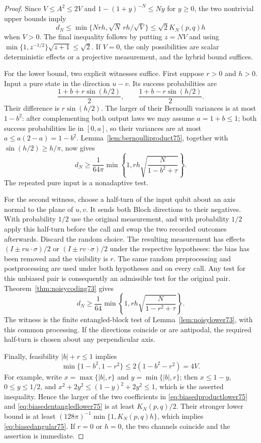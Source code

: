 \begin{proof}
Since $V\le A^2\le2V$ and
$1-(1+y)^{-N}\le Ny$ for $y\ge0$, the two nontrivial upper
bounds imply
\[
 d_N\le\min\{Nrh,\sqrt N\,rh/\sqrt V\}
            \le\sqrt2 K_N(p,q)h
\]
when $V>0$.  The final inequality follows by putting $z=NV$
and using $\min\{1,z^{-1/2}\}\sqrt{z+1}\le\sqrt2$.
If $V=0$, the only possibilities are scalar deterministic effects
or a projective measurement, and the hybrid bound suffices.

For the lower bound, two explicit witnesses suffice.  First suppose
$r>0$ and $h>0$.  Input a pure state in the direction $u-v$.
Its success probabilities are
\[
 \frac{1+b+r\sin(h/2)}2,\qquad
 \frac{1+b-r\sin(h/2)}2.
\]
Their difference is $r\sin(h/2)$.  The larger of their Bernoulli
variances is at most $1-b^2$: after complementing both output laws
we may assume $a=1+b\le1$; both success probabilities lie in
$[0,a]$, so their variances are at most $a\le a(2-a)=1-b^2$.
Lemma~\ref{lem:bernoulliproduct75}, together with
$\sin(h/2)\ge h/\pi$, now gives
\begin{equation}\label{eq:biasedproductlower75}
 d_N\ge\frac1{64\pi}\min\left\{1,
        rh\sqrt{\frac{N}{1-b^2+\tau}}\right\}.
\end{equation}
The repeated pure input is a nonadaptive test.

For the second witness, choose a half-turn of the input qubit about
an axis normal to the plane of $u,v$.  It sends both Bloch
directions to their negatives.  With probability $1/2$ use the
original measurement, and with probability $1/2$ apply this
half-turn before the call and swap the two recorded outcomes
afterwards.  Discard the random choice.  The resulting measurement
has effects $(I\pm r u\cdot\sigma)/2$ or
$(I\pm r v\cdot\sigma)/2$ under the respective hypotheses:
the bias has been removed and the visibility is $r$.
The same random preprocessing and postprocessing are used under
both hypotheses and on every call.  Any test for this unbiased
pair is consequently an admissible test for the original pair.
Theorem~\ref{thm:noisycoding73} gives
\begin{equation}\label{eq:biasedentangledlower75}
 d_N\ge\frac1{64}\min\left\{1,
        rh\sqrt{\frac{N}{1-r^2+\tau}}\right\}.
\end{equation}
The witness is the finite entangled-block test of
Lemma~\ref{lem:noisylower73}, with this common processing.
If the directions coincide or are antipodal, the required
half-turn is chosen about any perpendicular axis.

Finally, feasibility $|b|+r\le1$ implies
\[
 \min\{1-b^2,1-r^2\}\le2(1-b^2-r^2)=4V.
\]
For example, write $x=\max\{|b|,r\}$ and
$y=\min\{|b|,r\}$; then $x\le1-y$, $0\le y\le1/2$, and
$x^2+2y^2\le(1-y)^2+2y^2\le1$, which is the asserted
inequality.  Hence the larger of the two coefficients in
\eqref{eq:biasedproductlower75} and
\eqref{eq:biasedentangledlower75} is at least $K_N(p,q)/2$.
Their stronger lower bound is at least
$(128\pi)^{-1}\min\{1,K_N(p,q)h\}$, which implies
\eqref{eq:biasedangular75}.  If $r=0$ or $h=0$, the two channels
coincide and the assertion is immediate.
\end{proof}

